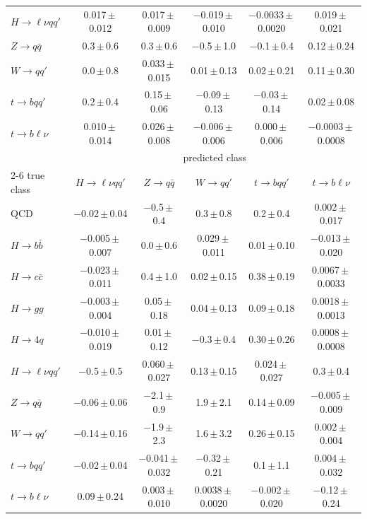 \begin{landscape}
{\begin{center}
\begin{minipage}{\linewidth}
\begin{tabular*}{\linewidth}{@{\extracolsep{\fill}}lccccc@{}}
$H\to \ell\nu qq'$ & 0.017\,$\pm$\,0.012 & 0.017\,$\pm$\,0.009 & $-$0.019\,$\pm$\,0.010 & $-$0.0033\,$\pm$\,0.0020 & 0.019\,$\pm$\,0.021 \\
$Z\to q\bar q$ & 0.3\,$\pm$\,0.6 & 0.3\,$\pm$\,0.6 & $-$0.5\,$\pm$\,1.0 & $-$0.1\,$\pm$\,0.4 & 0.12\,$\pm$\,0.24 \\
$W\to qq'$ & 0.0\,$\pm$\,0.8 & 0.033\,$\pm$\,0.015 & 0.01\,$\pm$\,0.13 & 0.02\,$\pm$\,0.21 & 0.11\,$\pm$\,0.30 \\
$t\to bqq'$ & 0.2\,$\pm$\,0.4 & 0.15\,$\pm$\,0.06 & $-$0.09\,$\pm$\,0.13 & $-$0.03\,$\pm$\,0.14 & 0.02\,$\pm$\,0.08 \\
$t\to b\ell\nu$ & 0.010\,$\pm$\,0.014 & 0.026\,$\pm$\,0.008 & $-$0.006\,$\pm$\,0.006 & 0.000\,$\pm$\,0.006 & $-$0.0003\,$\pm$\,0.0008 \\
\midrule
 & \multicolumn{5}{c}{predicted class} \\
\cmidrule(lr){2-6}
true class & $H\to \ell\nu qq'$ & $Z\to q\bar q$ & $W\to qq'$ & $t\to bqq'$ & $t\to b\ell\nu$ \\
\midrule
QCD & $-$0.02\,$\pm$\,0.04 & $-$0.5\,$\pm$\,0.4 & 0.3\,$\pm$\,0.8 & 0.2\,$\pm$\,0.4 & 0.002\,$\pm$\,0.017 \\
$H\to b\bar b$ & $-$0.005\,$\pm$\,0.007 & 0.0\,$\pm$\,0.6 & 0.029\,$\pm$\,0.011 & 0.01\,$\pm$\,0.10 & $-$0.013\,$\pm$\,0.020 \\
$H\to c\bar c$ & $-$0.023\,$\pm$\,0.011 & 0.4\,$\pm$\,1.0 & 0.02\,$\pm$\,0.15 & 0.38\,$\pm$\,0.19 & 0.0067\,$\pm$\,0.0033 \\
$H\to gg$ & $-$0.003\,$\pm$\,0.004 & 0.05\,$\pm$\,0.18 & 0.04\,$\pm$\,0.13 & 0.09\,$\pm$\,0.18 & 0.0018\,$\pm$\,0.0013 \\
$H\to 4q$ & $-$0.010\,$\pm$\,0.019 & 0.01\,$\pm$\,0.12 & $-$0.3\,$\pm$\,0.4 & 0.30\,$\pm$\,0.26 & 0.0008\,$\pm$\,0.0008 \\
$H\to \ell\nu qq'$ & $-$0.5\,$\pm$\,0.5 & 0.060\,$\pm$\,0.027 & 0.13\,$\pm$\,0.15 & 0.024\,$\pm$\,0.027 & 0.3\,$\pm$\,0.4 \\
$Z\to q\bar q$ & $-$0.06\,$\pm$\,0.06 & $-$2.1\,$\pm$\,0.9 & 1.9\,$\pm$\,2.1 & 0.14\,$\pm$\,0.09 & $-$0.005\,$\pm$\,0.009 \\
$W\to qq'$ & $-$0.14\,$\pm$\,0.16 & $-$1.9\,$\pm$\,2.3 & 1.6\,$\pm$\,3.2 & 0.26\,$\pm$\,0.15 & 0.002\,$\pm$\,0.004 \\
$t\to bqq'$ & $-$0.02\,$\pm$\,0.04 & $-$0.041\,$\pm$\,0.032 & $-$0.32\,$\pm$\,0.21 & 0.1\,$\pm$\,1.1 & 0.004\,$\pm$\,0.032 \\
$t\to b\ell\nu$ & 0.09\,$\pm$\,0.24 & 0.003\,$\pm$\,0.010 & 0.0038\,$\pm$\,0.0020 & $-$0.002\,$\pm$\,0.020 & $-$0.12\,$\pm$\,0.24 \\

\end{tabular*}
\end{minipage}
\end{center}}
\end{landscape}

